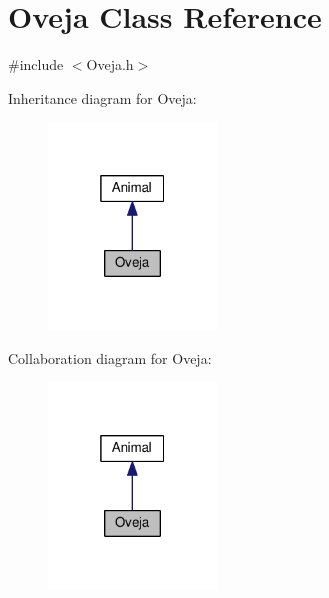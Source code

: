 \hypertarget{classOveja}{}\section{Oveja Class Reference}
\label{classOveja}


{\ttfamily \#include $<$Oveja.\+h$>$}



Inheritance diagram for Oveja\+:
\nopagebreak
\begin{figure}[H]
\begin{center}
\leavevmode
\includegraphics[width=127pt]{classOveja__inherit__graph}
\end{center}
\end{figure}


Collaboration diagram for Oveja\+:
\nopagebreak
\begin{figure}[H]
\begin{center}
\leavevmode
\includegraphics[width=127pt]{classOveja__coll__graph}
\end{center}
\end{figure}
